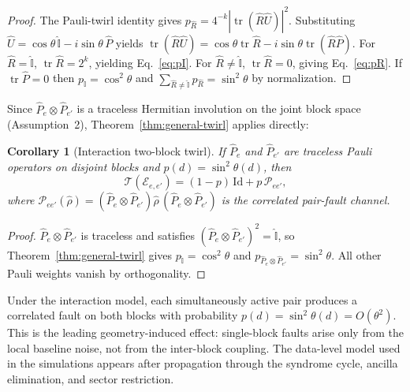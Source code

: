 \documentclass[
aps,
prx,
10pt,
twocolumn,
groupedaddress,
longbibliography,
nofootinbib,
floatfix
]{revtex4-2}
\newtheorem{corollary}{Corollary}
\theoremstyle{definition}
\newcommand{\I}{\hat{\mathbb{I}}}
\begin{document}
\begin{proof}
The Pauli-twirl identity gives $p_{\hat R}=4^{-k}|\operatorname{tr}(\hat R\hat U)|^2$. Substituting $\hat U=\cos\theta\,\hat{\mathbb{I}}-i\sin\theta\,\hat P$ yields $\operatorname{tr}(\hat R\hat U)=\cos\theta\operatorname{tr}\hat R-i\sin\theta\operatorname{tr}(\hat R\hat P)$. For $\hat R=\hat{\mathbb{I}}$, $\operatorname{tr}\hat R=2^k$, yielding Eq.~\eqref{eq:pI}. For $\hat R\neq\hat{\mathbb{I}}$, $\operatorname{tr}\hat R=0$, giving Eq.~\eqref{eq:pR}. If $\operatorname{tr}\hat P=0$ then $p_{\hat{\mathbb{I}}}=\cos^2\theta$ and $\sum_{\hat R\neq\hat{\mathbb{I}}}p_{\hat R}=\sin^2\theta$ by normalization.
\end{proof}

Since $\hat P_e\otimes\hat P_{e'}$ is a traceless Hermitian involution on the joint block space (Assumption~2), Theorem~\ref{thm:general-twirl} applies directly:

\begin{corollary}[Interaction two-block twirl]
\label{cor:twirl}
If $\hat P_e$ and $\hat P_{e'}$ are traceless Pauli operators on disjoint blocks and $p(d)=\sin^2\theta(d)$, then
\begin{equation}
\mathcal T\left(\mathcal E_{e,e'}\right)=(1-p)\,\mathrm{Id}+p\,\mathcal P_{ee'},
\label{eq:twirled-block}
\end{equation}
where $\mathcal P_{ee'}(\hat\rho)=(\hat P_e\otimes\hat P_{e'})\hat\rho\,(\hat P_e\otimes\hat P_{e'})$ is the correlated pair-fault channel.
\end{corollary}

\begin{proof}
$\hat P_e\otimes\hat P_{e'}$ is traceless and satisfies $(\hat P_e\otimes\hat P_{e'})^2=\I$, so Theorem~\ref{thm:general-twirl} gives $p_{\I}=\cos^2\theta$ and $p_{\hat P_e\otimes\hat P_{e'}}=\sin^2\theta$. All other Pauli weights vanish by orthogonality.
\end{proof}

Under the interaction model, each simultaneously active pair produces a correlated fault on both blocks with probability $p(d)=\sin^2\theta(d)=O(\theta^2)$. This is the leading geometry-induced effect: single-block faults arise only from the local baseline noise, not from the inter-block coupling. The data-level model used in the simulations appears after propagation through the syndrome cycle, ancilla elimination, and sector restriction.
\end{document}
